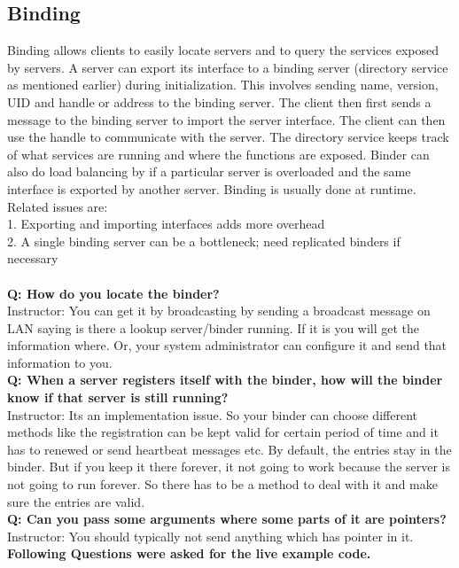 \documentclass[twoside]{article}
\begin{document}
\subsection{Binding}
Binding allows clients to easily locate servers and to query the services exposed by servers. A server can export its interface to a binding server (directory service as mentioned earlier) during initialization. This involves sending name, version, UID and handle or address to the binding server. The client then first sends a message to the binding server to import the server interface. The client can then use the handle to communicate with the server. The directory service keeps track of what services are running and where the functions are exposed. Binder can also do load balancing by if a particular server is overloaded and the same interface is exported by another server. Binding is usually done at runtime.\\
Related issues are:\\
1. Exporting and importing interfaces adds more overhead\\
2. A single binding server can be a bottleneck; need replicated binders if necessary\\
\\\textbf{Q: How do you locate the binder?}
\\{Instructor: You can get it by broadcasting by sending a broadcast message on LAN saying is there a lookup server/binder running. If it is you will get the information where. Or, your system administrator can configure it and send that information to you. }
\\\textbf{Q: When a server registers itself with the binder, how will the binder know if that server is still running?}
\\{Instructor: Its an implementation issue. So your binder can choose different methods like the registration can be kept valid for certain period of time and it has to renewed or send  heartbeat messages etc. By default, the entries stay in the binder. But if you keep it there forever, it not going to work because the server is not going to run forever. So there has to be a method to deal with it and make sure the entries are valid.}
\\\textbf{Q: Can you pass some arguments where some parts of it are pointers?}
\\{Instructor: You should typically not send anything which has pointer in it.}
\\\textbf{Following Questions were asked for the live example code.}
\end{document}
